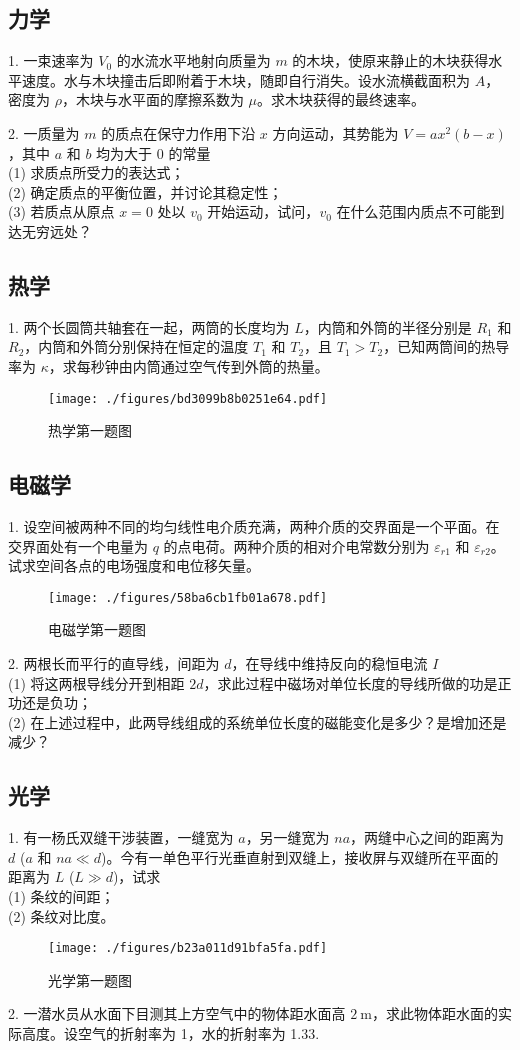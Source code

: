 \subsection{力学}
1. 一束速率为 $V_{0}$ 的水流水平地射向质量为 $m$ 的木块，使原来静止的木块获得水平速度。水与木块撞击后即附着于木块，随即自行消失。设水流横截面积为 $A$，密度为 $\rho$，木块与水平面的摩擦系数为 $\mu$。求木块获得的最终速率。

2. 一质量为 $m$ 的质点在保守力作用下沿 $x$ 方向运动，其势能为 $V=a x^{2}(b-x)$，其中 $a$ 和 $b$ 均为大于 0 的常量\\
(1) 求质点所受力的表达式；\\
(2) 确定质点的平衡位置，并讨论其稳定性；\\
(3) 若质点从原点 $x=0$ 处以 $v_{0}$ 开始运动，试问，$v_{0}$ 在什么范围内质点不可能到达无穷远处？
\subsection{热学}
1. 两个长圆筒共轴套在一起，两筒的长度均为 $L$，内筒和外筒的半径分别是 $R_{1}$ 和 $R_{2}$，内筒和外筒分别保持在恒定的温度 $T_{1}$ 和 $T_{2}$，且 $T_{1}>T_{2}$，已知两筒间的热导率为 $\kappa$，求每秒钟由内筒通过空气传到外筒的热量。
\begin{figure}[ht]
\centering
\texttt{[image: ./figures/bd3099b8b0251e64.pdf]}
\caption{热学第一题图} \label{fig_NJU16_1}
\end{figure}
\subsection{电磁学}
1. 设空间被两种不同的均匀线性电介质充满，两种介质的交界面是一个平面。在交界面处有一个电量为 $q$ 的点电荷。两种介质的相对介电常数分别为 $\varepsilon_{r 1}$ 和 $\varepsilon_{r 2}$。试求空间各点的电场强度和电位移矢量。
\begin{figure}[ht]
\centering
\texttt{[image: ./figures/58ba6cb1fb01a678.pdf]}
\caption{电磁学第一题图} \label{fig_NJU16_2}
\end{figure}
2. 两根长而平行的直导线，间距为 $d$，在导线中维持反向的稳恒电流 $I$\\
(1) 将这两根导线分开到相距 $2 d$，求此过程中磁场对单位长度的导线所做的功是正功还是负功；\\
(2) 在上述过程中，此两导线组成的系统单位长度的磁能变化是多少？是增加还是减少？
\subsection{光学}
1. 有一杨氏双缝干涉装置，一缝宽为 $a$，另一缝宽为 $na$，两缝中心之间的距离为 $d$ ($a$ 和 $na \ll d$)。今有一单色平行光垂直射到双缝上，接收屏与双缝所在平面的距离为 $L$ ($L \gg d$)，试求\\
(1) 条纹的间距；\\
(2) 条纹对比度。
\begin{figure}[ht]
\centering
\texttt{[image: ./figures/b23a011d91bfa5fa.pdf]}
\caption{光学第一题图} \label{fig_NJU16_3}
\end{figure}
2. 一潜水员从水面下目测其上方空气中的物体距水面高 $2 \mathrm{~m}$，求此物体距水面的实际高度。设空气的折射率为 1，水的折射率为 1.33.
